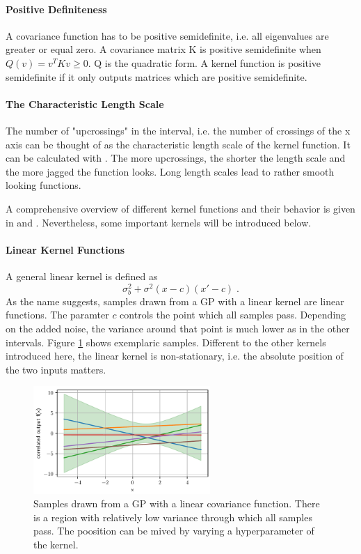 \documentclass[%
  a4paper,oneside,%
  11pt,%
  smallchapters,
  style=printdev,
  extramargin,
  green,%
  rgb, <cmyk>
  ]{tubsbook}
\begin{document}
\paragraph{Positive Definiteness} A covariance function has to be positive semidefinite, i.e. all eigenvalues are greater or equal zero. A covariance matrix K is positive semidefinite when $Q(v) = v^T K v \geq 0$. Q is the quadratic form. A kernel function is positive semidefinite if it only outputs matrices which are positive semidefinite.


\paragraph{The Characteristic Length Scale} The number of "upcrossings" in the interval, i.e. the number of crossings of the x axis can be thought of as the characteristic length scale of the kernel function. It can be calculated with \cite[Eq. 4.3]{rasmussen2006}. The more upcrossings, the shorter the length scale and the more jagged the function looks. Long length scales lead to rather smooth looking functions.

A comprehensive overview of different kernel functions and their behavior is given in \cite{Duvenaud} and \cite{gortler2019}. Nevertheless, some important kernels will be introduced below.
%

\paragraph{Linear Kernel Functions}
A general linear kernel is defined as
\begin{equation}
\sigma_b^2 + \sigma^2 (x-c) (x'-c) \;.
\end{equation}
As the name suggests, samples drawn from a GP with a linear kernel are linear functions. The paramter $c$ controls the point which all samples pass. Depending on the added noise, the variance around that point is much lower as in the other intervals. Figure \ref{fig:Linear} shows exemplaric samples. Different to the other kernels introduced here, the linear kernel is non-stationary, i.e. the absolute position of the two inputs matters.
\begin{figure}[!ht]
\begin{center}
\includegraphics[width=0.6\textwidth]{pics/LinearKernel.pdf}
\caption{Samples drawn from a GP with a linear covariance function. There is a region with relatively low variance through which all samples pass. The poosition can be mived by varying a hyperparameter of the kernel.}
\label{fig:Linear}
\end{center}
\end{figure}
\end{document}

